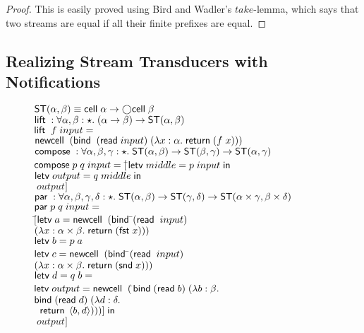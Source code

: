 \begin{proof}
  This is easily proved using Bird and Wadler's $take$-lemma, which
  says that two streams are equal if all their finite prefixes are
  equal.
\end{proof}


\subsection{Realizing Stream Transducers with Notifications}

\begin{figure}
\mbox{}
\begin{tabbing}
$\mathsf{ST}({\alpha}, {\beta}) \equiv \mathsf{cell}\;{\alpha} \to \bigcirc{\mathsf{cell}\;{\beta}}$ \\[1em]

$\mathsf{lift}\; : \forall \alpha,\beta:\star.\; (\alpha \to \beta) \to \mathsf{ST}({\alpha}, {\beta})$ \\
$\mathsf{lift}\;\;f\;input = $ \\
\;\; $\mathsf{newcell}\;\; (\mathsf{bind}\;\;(\mathsf{read}\; input)\; (\lambda x:\alpha.\;\mathsf{return}\; (f\;x)))$ \\[1em]

$\mathsf{compose}\; : \forall \alpha,\beta,\gamma:\star.\; \mathsf{ST}({\alpha}, {\beta}) \to \mathsf{ST}({\beta}, {\gamma}) \to \mathsf{ST}({\alpha}, {\gamma})$ \\
$\mathsf{compose}\; p\;q\;input = [$\=$\letv{middle}{p\;input}$ \\
                            \>$\letv{output}{q\;middle}$ \\ 
                            \>$\;output]$ \\[1em]

$\mathsf{par}\; : \forall \alpha,\beta,\gamma,\delta:\star.\; \mathsf{ST}({\alpha}, {\beta}) \to \mathsf{ST}({\gamma}, {\delta}) \to \mathsf{ST}({\alpha \times \gamma}, {\beta \times \delta})$ \\
$\mathsf{par}\; p \; q \; input = $ \\
\;\;$[$\=$\mathsf{letv}\;a = \mathsf{newcell}\;\; (\mathsf{bind}\;$\=$(\mathsf{read}\;\;input)$ \\
     \>                                   \>$(\lambda x:\alpha\times \beta.\;\mathsf{return}\; (\mathsf{fst}\; x)))$ \\
     \>$\mathsf{letv}\;b = {p\;a}{}$ \\
     \>$\mathsf{letv}\;c = \mathsf{newcell}\;\; (\mathsf{bind}\;$\=$(\mathsf{read}\;\;input)\;$\\ 
     \>                                   \>$(\lambda x:\alpha\times \beta.\;\mathsf{return}\; (\mathsf{snd}\; x)))$ \\
     \>$\mathsf{letv}\;d = {q\;b} = $ \\
     \>$\mathsf{letv}\;output = \mathsf{newcell}\;\; ($\=$\mathsf{bind}\; (\mathsf{read}\; b)\; (\lambda b:\beta.$ \\
     \>                                   \>$\mathsf{bind}\; (\mathsf{read}\; d)\; (\lambda d:\delta.$ \\
     \>                                   \>$\;\;\mathsf{return}\; \left<{b},{d}\right>)))] \;\mathsf{in}$ \\
     \>$\;output]$ \\[1em]


\end{tabbing}
\end{figure}
